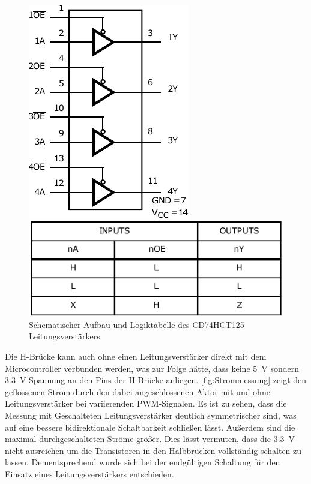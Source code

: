 \begin{figure}[H]
	\begin{center}
		\noindent\begin{minipage}[h!]{0.45\textwidth} %
			\centering
			\includegraphics[height=0.85\textwidth]{Bilder/buffer.pdf}
		\end{minipage} %
		\quad
		\begin{minipage}[h!]{0.45\textwidth} %
			\centering
			\includegraphics[height=0.3\textwidth]{Bilder/tabelle.pdf}
		\end{minipage} %
	\end{center}
	\caption{Schematischer Aufbau und Logiktabelle des CD74HCT125 Leitungsverstärkers \cite[S.2]{Buffer}}
	\label{fig:buffer}
\end{figure}\noindent
Die H-Brücke kann auch ohne einen Leitungsverstärker direkt mit dem Microcontroller verbunden werden, was zur Folge hätte, dass keine \SI{5}{V} sondern \SI{3,3}{V} Spannung an den Pins der H-Brücke anliegen. \autoref{fig:Strommessung} zeigt den geflossenen Strom durch den dabei angeschlossenen Aktor mit und ohne Leitungsverstärker bei variierenden PWM-Signalen. Es ist zu sehen, dass die Messung mit Geschalteten Leitungsverstärker deutlich symmetrischer sind, was auf eine bessere bidirektionale Schaltbarkeit schließen lässt. Außerdem sind die maximal durchgeschalteten Ströme größer. Dies lässt vermuten, dass die \SI{3,3}{V} nicht ausreichen um die Transistoren in den Halbbrücken vollständig schalten zu lassen. Dementsprechend wurde sich bei der endgültigen Schaltung für den Einsatz eines Leitungsverstärkers entschieden. 

